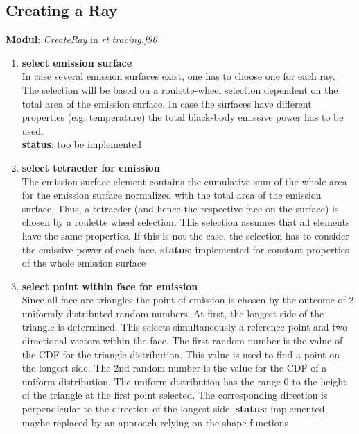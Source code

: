 \documentclass[a4paper,10pt]{scrartcl}
\begin{document}
\subsection{Creating a Ray}
\textbf{Modul}: \textit{CreateRay} in \textit{rt$\_$tracing.f90} 
\begin{enumerate}
 \item \textbf{select emission surface} \\
       In case several emission surfaces exist, one has to choose one for each ray. The selection will be based on a roulette-wheel selection dependent on the total area of the emission surface. In case the surfaces have different properties (e.g. temperature) the total black-body emissive power has to be used.\\
       \textbf{status}: too be implemented

 \item \textbf{select tetraeder for emission} \\
       The emission surface element contains the cumulative sum of the whole area for the emission surface normalized with the total area of the emission surface. Thus, a tetraeder (and hence the respective face on the surface) is chosen by a roulette wheel selection. This selection assumes that all elements have the same properties. If this is not the case, the selection has to consider the emissive power of each face.
       \textbf{status}: implemented for constant properties of the whole emission surface
 
 \item \textbf{select point within face for emission} \\
       Since all face are triangles the point of emission is chosen by the outcome of 2 uniformly distributed random numbers. At first, the longest side of the triangle is determined. This selects simultaneously a reference point and two directional vectors within the face. The first random number is the value of the CDF for the triangle distribution. This value is used to find a point on the longest side. The 2nd random number is the value for the CDF of a uniform distribution. The uniform distribution has the range $0$ to the height of the triangle at the first point selected. The corresponding direction is perpendicular to the direction of the longest side.
       \textbf{status}: implemented, maybe replaced by an approach relying on the shape functions
       

\end{enumerate}
\end{document}
